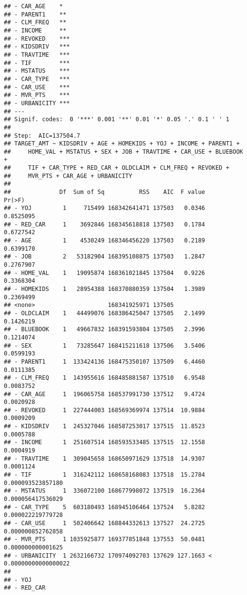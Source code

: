 \documentclass[
]{article}
\begin{document}
\begin{verbatim}
## - CAR_AGE    *  
## - PARENT1    ** 
## - CLM_FREQ   ** 
## - INCOME     ** 
## - REVOKED    ***
## - KIDSDRIV   ***
## - TRAVTIME   ***
## - TIF        ***
## - MSTATUS    ***
## - CAR_TYPE   ***
## - CAR_USE    ***
## - MVR_PTS    ***
## - URBANICITY ***
## ---
## Signif. codes:  0 '***' 0.001 '**' 0.01 '*' 0.05 '.' 0.1 ' ' 1
## 
## Step:  AIC=137504.7
## TARGET_AMT ~ KIDSDRIV + AGE + HOMEKIDS + YOJ + INCOME + PARENT1 + 
##     HOME_VAL + MSTATUS + SEX + JOB + TRAVTIME + CAR_USE + BLUEBOOK + 
##     TIF + CAR_TYPE + RED_CAR + OLDCLAIM + CLM_FREQ + REVOKED + 
##     MVR_PTS + CAR_AGE + URBANICITY
## 
##              Df  Sum of Sq          RSS    AIC  F value                Pr(>F)
## - YOJ         1     715499 168342641471 137503   0.0346             0.8525095
## - RED_CAR     1    3692846 168345618818 137503   0.1784             0.6727542
## - AGE         1    4530249 168346456220 137503   0.2189             0.6399170
## - JOB         2   53182904 168395108875 137503   1.2847             0.2767907
## - HOME_VAL    1   19095874 168361021845 137504   0.9226             0.3368304
## - HOMEKIDS    1   28954388 168370880359 137504   1.3989             0.2369499
## <none>                     168341925971 137505                               
## - OLDCLAIM    1   44499076 168386425047 137505   2.1499             0.1426219
## - BLUEBOOK    1   49667832 168391593804 137505   2.3996             0.1214074
## - SEX         1   73285647 168415211618 137506   3.5406             0.0599193
## - PARENT1     1  133424136 168475350107 137509   6.4460             0.0111385
## - CLM_FREQ    1  143955616 168485881587 137510   6.9548             0.0083752
## - CAR_AGE     1  196065758 168537991730 137512   9.4724             0.0020928
## - REVOKED     1  227444003 168569369974 137514  10.9884             0.0009209
## - KIDSDRIV    1  245327046 168587253017 137515  11.8523             0.0005788
## - INCOME      1  251607514 168593533485 137515  12.1558             0.0004919
## - TRAVTIME    1  309045658 168650971629 137518  14.9307             0.0001124
## - TIF         1  316242112 168658168083 137518  15.2784     0.000093523857180
## - MSTATUS     1  336072100 168677998072 137519  16.2364     0.000056417536029
## - CAR_TYPE    5  603180493 168945106464 137524   5.8282     0.000022219779728
## - CAR_USE     1  502406642 168844332613 137527  24.2725     0.000000852762858
## - MVR_PTS     1 1035925877 169377851848 137553  50.0481     0.000000000001625
## - URBANICITY  1 2632166732 170974092703 137629 127.1663 < 0.00000000000000022
##                 
## - YOJ           
## - RED_CAR       

\end{verbatim}
\end{document}
